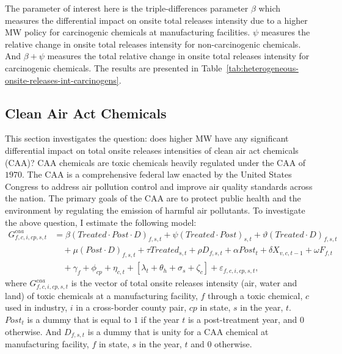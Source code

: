 \documentclass[12pt, english]{article}
\begin{document}
    The parameter of interest here is the triple-differences parameter $\beta$ which measures the differential impact on onsite total releases intensity due to a higher MW policy for carcinogenic chemicals at manufacturing facilities. $\psi$ measures the relative change in onsite total releases intensity for non-carcinogenic chemicals. And $\beta + \psi$ measures the total relative change in onsite total releases intensity for carcinogenic chemicals. The results are presented in Table~\ref{tab:heterogeneous-onsite-releases-int-carcinogens}.
    

    \subsection{Clean Air Act Chemicals}\label{subsec:clean-air-act-chemicals}
    This section investigates the question: does higher MW have any significant differential impact on total onsite releases intensities of clean air act chemicals (CAA)? CAA chemicals are toxic chemicals heavily regulated under the CAA of $1970$. The CAA is a comprehensive federal law enacted by the United States Congress to address air pollution control and improve air quality standards across the nation. The primary goals of the CAA are to protect public health and the environment by regulating the emission of harmful air pollutants. To investigate the above question, I estimate the following model:
    \begin{align}
        G_{f,c,i,cp,s,t}^{caa} &= \beta (Treated \cdot Post \cdot D)_{f,s,t} + \psi (Treated \cdot Post)_{s,t} + \vartheta (Treated \cdot D)_{f,s,t} \nonumber \\
        &\quad + \mu (Post \cdot D)_{f,s,t} + \tau Treated_{s,t} + \rho D_{f,s,t} + \alpha Post_{t} + \delta X_{v,c,t-1} + \omega F_{f,t} \nonumber \\
        &\quad + \gamma_{f} + \phi_{cp} + \eta_{c,t} + \left[\lambda_{t} + \theta_{h} + \sigma_{s} + \zeta_{c} \right] + \varepsilon_{f,c,i,cp,s,t},\label{eq:heterogeneous-onsite-releases-intensity-caa}
    \end{align}
    where $G_{f,c,i,cp,s,t}^{caa}$ is the vector of total onsite releases intensity (air, water and land) of toxic chemicals at a manufacturing facility, $f$ through a toxic chemical, $c$ used in industry, $i$ in a cross-border county pair, $cp$ in state, $s$ in the year, $t$. $Post_{t}$ is a dummy that is equal to $1$ if the year $t$ is a post-treatment year, and $0$ otherwise. And $D_{f,s,t}$ is a dummy that is unity for a CAA chemical at manufacturing facility, $f$ in state, $s$ in the year, $t$ and $0$ otherwise.
    
\end{document}

